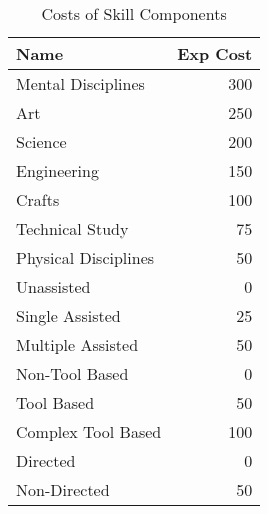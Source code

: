 \begin{table}
	\begin{tabular}{lr}
	Name                    &       Exp Cost  \\
\hline
	Mental Disciplines      &       300       \\
	Art                     &       250       \\
	Science                 &       200       \\
	Engineering             &       150       \\
	Crafts                  &       100       \\
	Technical Study         &       75        \\
	Physical Disciplines    &       50        \\    \hline
	Unassisted              &        0        \\
	Single Assisted         &        25       \\
	Multiple Assisted       &        50       \\    \hline
	Non-Tool Based          &        0        \\
	Tool Based              &        50       \\
	Complex Tool Based      &        100      \\    \hline
	Directed                &        0        \\
	Non-Directed            &        50       \\    
	\end{tabular}
    \caption{Costs of Skill Components}
\end{table}

